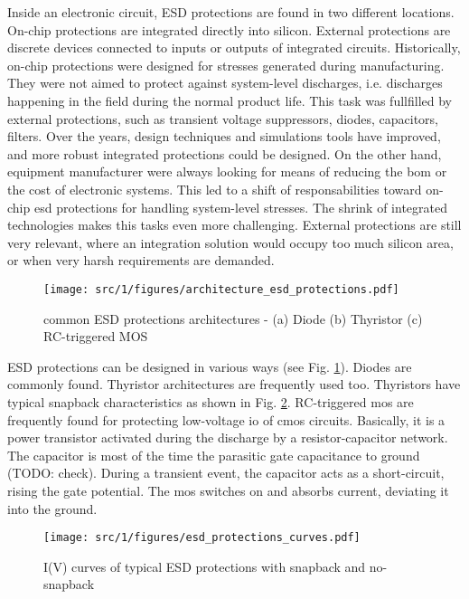 Inside an electronic circuit, ESD protections are found in two different locations.
On-chip protections are integrated directly into silicon.
External protections are discrete devices connected to inputs or outputs of integrated circuits.
Historically, on-chip protections were designed for stresses generated during manufacturing.
They were not aimed to protect against system-level discharges, i.e. discharges happening in the field during the normal product life.
This task was fullfilled by external protections, such as transient voltage suppressors, diodes, capacitors, filters.
Over the years, design techniques and simulations tools have improved, and more robust integrated protections could be designed.
On the other hand, equipment manufacturer were always looking for means of reducing the \gls{bom} or the cost of electronic systems.
This led to a shift of responsabilities toward on-chip \gls{esd} protections for handling system-level stresses.
The shrink of integrated technologies makes this tasks even more challenging.
External protections are still very relevant, where an integration solution would occupy too much silicon area, or when very harsh requirements are demanded.

\begin{figure}[!h]
  \centering
  \texttt{[image: src/1/figures/architecture\_esd\_protections.pdf]}
  \caption{common ESD protections architectures - (a) Diode (b) Thyristor (c) RC-triggered MOS}
  \label{fig:architecture-esd-protection}
\end{figure}

ESD protections can be designed in various ways (see Fig. \ref{fig:architecture-esd-protection}).
Diodes are commonly found.
Thyristor architectures are frequently used too.
Thyristors have typical snapback characteristics as shown in Fig. \ref{fig:iv-curve-esd-protection}.
RC-triggered \gls{mos} are frequently found for protecting low-voltage \gls{io} of \gls{cmos} circuits.
Basically, it is a power transistor activated during the discharge by a resistor-capacitor network.
The capacitor is most of the time the parasitic gate capacitance to ground (TODO: check).
During a transient event, the capacitor acts as a short-circuit, rising the gate potential.
The \gls{mos} switches on and absorbs current, deviating it into the ground.

\begin{figure}[!h]
  \centering
  \texttt{[image: src/1/figures/esd\_protections\_curves.pdf]}
  \caption{I(V) curves of typical ESD protections with snapback and no-snapback}
  \label{fig:iv-curve-esd-protection}
\end{figure}

